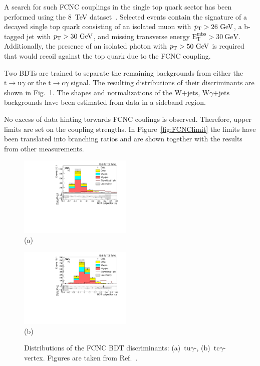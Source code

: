 \documentclass{PoS}
\begin{document}
A search for such FCNC couplings in the single top quark sector has been performed using the 8~TeV dataset~\cite{CMS-PAS-TOP-14-003}. Selected events contain the signature of a decayed single top quark consisting of an isolated muon with $p_\mathrm{T}>26~\mathrm{GeV}$, a b-tagged jet with $p_\mathrm{T}>30~\mathrm{GeV}$, and missing transverse energy $\mathrm{E}^\mathrm{miss}_\mathrm{T}>30~\mathrm{GeV}$. Additionally, the presence of an isolated photon with $p_\mathrm{T}>50~\mathrm{GeV}$ is required that would recoil against the top quark due to the FCNC coupling.


Two BDTs are trained to separate the remaining backgrounds from either the $\mathrm{t}\to\mathrm{u}\gamma$ or the $\mathrm{t}\to\mathrm{c}\gamma$ signal. The resulting distributions of their discriminants are shown in Fig.~\ref{fig:FCNC}. The shapes and normalizations of the $\mathrm{W}\mbox{+}\mathrm{jets}$, $\mathrm{W}\gamma\mbox{+}\mathrm{jets}$ backgrounds have been estimated from data in a sideband region. 


No excess of data hinting torwards FCNC coulings is observed. Therefore, upper limits are set on the coupling strengths. In Figure~\ref{fig:FCNClimit} the limits have been translated into branching ratios and are shown together with the results from other measurements.


\begin{figure}[htbp]
\begin{center}
\parbox[t]{0.49\textwidth}{\centering\includegraphics[width=0.48\textwidth]{figures/FCNC/BDT_utg.pdf}\\(a)}
\parbox[t]{0.49\textwidth}{\centering\includegraphics[width=0.48\textwidth]{figures/FCNC/BDT_ctg.pdf}\\(b)}
\caption{\label{fig:FCNC}Distributions of the FCNC BDT discriminants: (a)~$\mathrm{tu}\gamma$-, (b)~$\mathrm{tc}\gamma$-vertex. Figures are taken from Ref.~\cite{CMS-PAS-TOP-14-003}.}
\end{center}
\end{figure}
\end{document}
